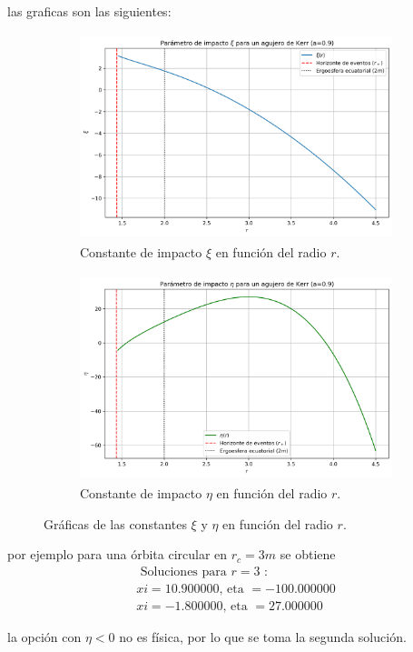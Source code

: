 las graficas son las siguientes:
\begin{figure}[H]
\begin{subfigure}{0.5\textwidth}
\includegraphics[width=0.9\linewidth, height=6cm]{AgujerosNegros/kerr/geodesics_plots/circular_xi_vs_r_kerr.png} 
\caption{Constante de impacto $\xi$ en función del radio $r$.}
\end{subfigure}
\begin{subfigure}{0.5\textwidth}
\includegraphics[width=0.9\linewidth, height=6cm]{AgujerosNegros/kerr/geodesics_plots/circular_eta_vs_r_kerr.png}
\caption{Constante de impacto $\eta$ en función del radio $r$.}
\end{subfigure}
\caption{Gráficas de las constantes $\xi$ y $\eta$ en función del radio $r$.}
\end{figure}

por ejemplo para una órbita circular en $r_c = 3m$ se obtiene
\begin{equation}
\begin{array}{l}
\text { Soluciones para } r=3 \text { : } \\
x i=10.900000 \text {, eta }=-100.000000 \\
x i=-1.800000 \text {, eta }=27.000000
\end{array}
\end{equation}

la opción con $\eta < 0$ no es física, por lo que se toma la segunda solución.

